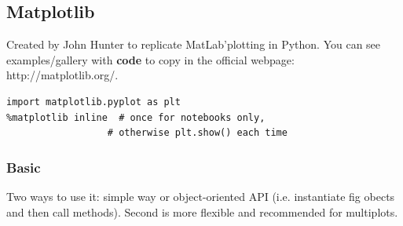 \documentclass[11pt]{article}
\begin{document}
\subsection{Matplotlib}
Created by John Hunter to replicate MatLab'plotting in Python. You can see examples/gallery with \textbf{code} to copy in the official webpage: http://matplotlib.org/.
\begin{lstlisting}
import matplotlib.pyplot as plt
%matplotlib inline  # once for notebooks only, 
                  # otherwise plt.show() each time
\end{lstlisting}

\subsubsection{Basic}
Two ways to use it: simple way or object-oriented API (i.e. instantiate fig obects and then call methods). Second is more flexible and recommended for multiplots.
\end{document}
